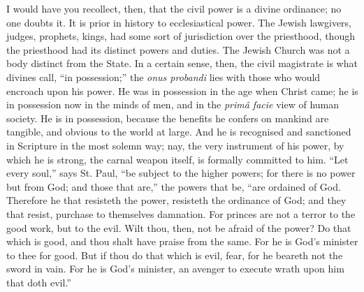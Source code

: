 I would have you recollect, then, that the civil power is a divine
ordinance; no one doubts it. It is prior in history to ecclesiastical
power. The Jewish lawgivers, judges, prophets, kings, had some sort of
jurisdiction over the priesthood, though the priesthood had its
distinct powers and duties. The Jewish Church was not a body distinct
from the State. In a certain sense, then, the civil magistrate is what
divines call, ``in possession;'' the \emph{onus probandi} lies
with those who would encroach upon his power. He was in possession in
the age when Christ came; he is in possession now in the minds of men,
and in the \emph{primâ facie} view of human society. He is in
possession, because the benefits he confers on mankind are tangible,
and obvious to the world at large. And he is recognised and sanctioned
in Scripture in the most solemn way; nay, the very instrument of his
power, by which he is strong, the carnal weapon itself, is formally
committed to him. ``Let every soul,'' says St. Paul, ``be
subject to the higher powers; for there is no power but from God; and
those that are,'' the powers that be, ``are ordained of God.
Therefore he that resisteth the power, resisteth the ordinance of God;
and they that resist, purchase to themselves damnation. For princes
are not a terror to the good work, but to the evil. Wilt thou, then,
not be afraid of the power? Do that which is good, and thou shalt have
praise from the same. For he is God's minister to thee for good. But
if thou do that which is evil, fear, for he beareth not the sword in
vain. For he is God's minister, an avenger to execute wrath upon him
that doth evil.''

